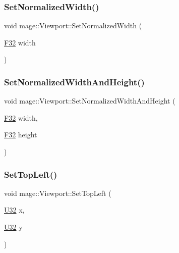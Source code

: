 \hypertarget{classmage_1_1_viewport_af79a62d7996eb67cf9be99e3e7258f6a}{}\label{classmage_1_1_viewport_af79a62d7996eb67cf9be99e3e7258f6a} 
\subsubsection{\texorpdfstring{Set\+Normalized\+Width()}{SetNormalizedWidth()}}
{\footnotesize\ttfamily void mage\+::\+Viewport\+::\+Set\+Normalized\+Width (\begin{DoxyParamCaption}\item[{\hyperlink{namespacemage_aa97e833b45f06d60a0a9c4fc22ae02c0}{F32}}]{width }\end{DoxyParamCaption})\hspace{0.3cm}{\ttfamily [noexcept]}}

\hypertarget{classmage_1_1_viewport_ae456cd1a570d41bff6939d29722fa8ca}{}\label{classmage_1_1_viewport_ae456cd1a570d41bff6939d29722fa8ca} 
\subsubsection{\texorpdfstring{Set\+Normalized\+Width\+And\+Height()}{SetNormalizedWidthAndHeight()}}
{\footnotesize\ttfamily void mage\+::\+Viewport\+::\+Set\+Normalized\+Width\+And\+Height (\begin{DoxyParamCaption}\item[{\hyperlink{namespacemage_aa97e833b45f06d60a0a9c4fc22ae02c0}{F32}}]{width,  }\item[{\hyperlink{namespacemage_aa97e833b45f06d60a0a9c4fc22ae02c0}{F32}}]{height }\end{DoxyParamCaption})\hspace{0.3cm}{\ttfamily [noexcept]}}

\hypertarget{classmage_1_1_viewport_a14f63922d0bd2613b3fc2b86683f13a7}{}\label{classmage_1_1_viewport_a14f63922d0bd2613b3fc2b86683f13a7} 
\subsubsection{\texorpdfstring{Set\+Top\+Left()}{SetTopLeft()}\hspace{0.1cm}{\footnotesize\ttfamily [1/2]}}
{\footnotesize\ttfamily void mage\+::\+Viewport\+::\+Set\+Top\+Left (\begin{DoxyParamCaption}\item[{\hyperlink{namespacemage_a41c104c036fba3756a74e19f793eeaa1}{U32}}]{x,  }\item[{\hyperlink{namespacemage_a41c104c036fba3756a74e19f793eeaa1}{U32}}]{y }\end{DoxyParamCaption})\hspace{0.3cm}{\ttfamily [noexcept]}}


